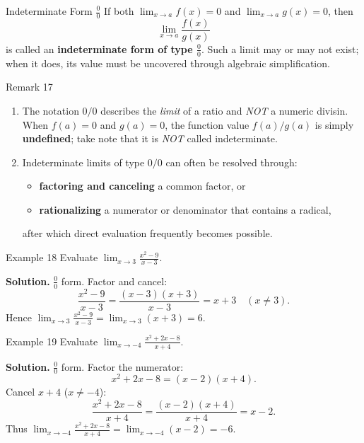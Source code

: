 \begin{definitionbox}{Indeterminate Form \(\displaystyle\frac{0}{0}\)}
If both \(\displaystyle\lim_{x \to a} f(x) = 0\) and \(\displaystyle\lim_{x \to a} g(x) = 0\), then
\[
\lim_{x \to a} \frac{f(x)}{g(x)}
\]
is called an \textbf{indeterminate form of type \(\frac{0}{0}\)}.  Such a limit may or may not exist; when it does, its value must be uncovered through algebraic simplification.
\end{definitionbox}

\begin{remarkbox}{Remark 17}
\begin{enumerate}
    \item The notation \(0/0\) describes the \emph{limit} of a ratio and \emph{NOT} a numeric divisin.  When \(f(a) = 0\) and \(g(a) = 0\), the function value \(f(a)/g(a)\) is simply \textbf{undefined}; take note that it is \emph{NOT} called indeterminate.

    \item Indeterminate limits of type \(0/0\) can often be resolved through:
    \begin{itemize}
        \item \textbf{factoring and canceling} a common factor, or
        \item \textbf{rationalizing} a numerator or denominator that contains a radical,
    \end{itemize}
    after which direct evaluation frequently becomes possible.
\end{enumerate}
\end{remarkbox}

\begin{examplebox}{Example 18}
Evaluate \(\displaystyle\lim_{x \to 3} \frac{x^{2} - 9}{x - 3}\).

\medskip
\textbf{Solution.} \(\frac{0}{0}\) form.  Factor and cancel:
\[
\frac{x^{2} - 9}{x - 3}
= \frac{(x - 3)(x + 3)}{x - 3}
= x + 3 \quad (x \neq 3).
\]
Hence \(\displaystyle\lim_{x \to 3} \frac{x^{2} - 9}{x - 3}
= \lim_{x \to 3} (x + 3) = 6.\)
\end{examplebox}

\begin{examplebox}{Example 19}
Evaluate \(\displaystyle\lim_{x \to -4} \frac{x^{2} + 2x - 8}{x + 4}\).

\medskip
\textbf{Solution.} \(\frac{0}{0}\) form.  Factor the numerator:
\[
x^{2} + 2x - 8 = (x - 2)(x + 4).
\]
Cancel \(x + 4\) (\(x \neq -4\)):
\[
\frac{x^{2} + 2x - 8}{x + 4}
= \frac{(x - 2)(x + 4)}{x + 4}
= x - 2.
\]
Thus \(\displaystyle\lim_{x \to -4} \frac{x^{2} + 2x - 8}{x + 4}
= \lim_{x \to -4} (x - 2) = -6.\)
\end{examplebox}

